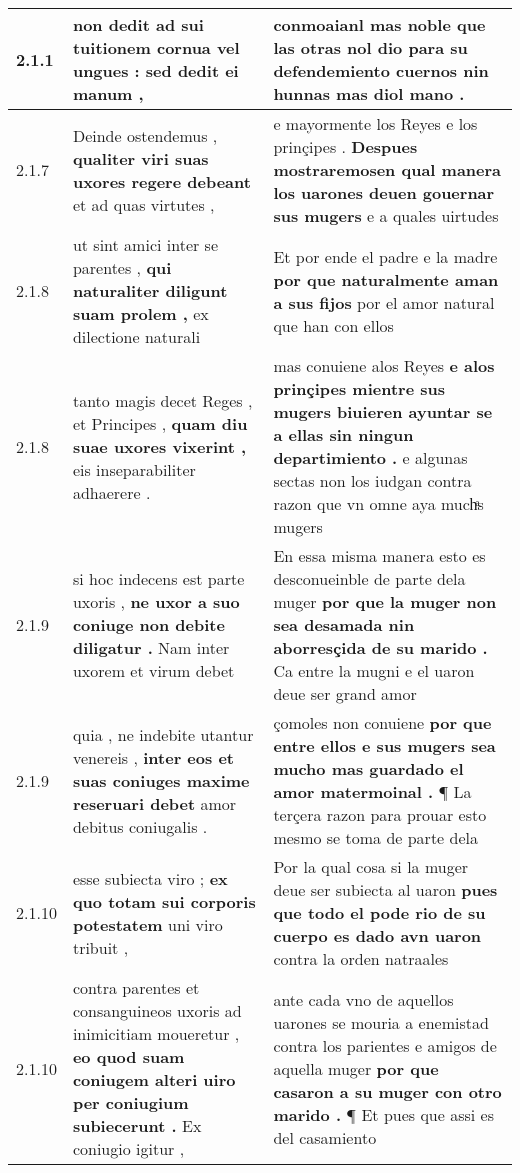 \begin{tabular}{|p{1cm}|p{6.5cm}|p{6.5cm}|}
2.1.1 & non dedit \textbf{ ad sui tuitionem cornua vel ungues : } sed dedit ei manum , & conmoaianl mas noble que las otras nol dio \textbf{ para su defendemiento cuernos } nin hunnas mas diol mano . \\\hline
2.1.7 & Deinde ostendemus , \textbf{ qualiter viri suas uxores regere debeant } et ad quas virtutes , & e mayormente los Reyes e los prinçipes . \textbf{ Despues mostraremosen qual manera los uarones deuen gouernar sus mugers } e a quales uirtudes \\\hline
2.1.8 & ut sint amici inter se parentes , \textbf{ qui naturaliter diligunt suam prolem , } ex dilectione naturali & Et por ende el padre e la madre \textbf{ por que naturalmente aman a sus fijos } por el amor natural que han con ellos \\\hline
2.1.8 & tanto magis decet Reges , et Principes , \textbf{ quam diu suae uxores vixerint , } eis inseparabiliter adhaerere . & mas conuiene alos Reyes \textbf{ e alos prinçipes mientre sus mugers biuieren ayuntar se a ellas sin ningun departimiento . } e algunas sectas non los iudgan contra razon que vn omne aya muchͣs mugers \\\hline
2.1.9 & si hoc indecens est parte uxoris , \textbf{ ne uxor a suo coniuge non debite diligatur . } Nam inter uxorem et virum debet & En essa misma manera esto es desconueinble de parte dela muger \textbf{ por que la muger non sea desamada nin aborresçida de su marido . } Ca entre la mugni e el uaron deue ser grand amor \\\hline
2.1.9 & quia , ne indebite utantur venereis , \textbf{ inter eos et suas coniuges maxime reseruari debet } amor debitus coniugalis . & çomoles non conuiene \textbf{ por que entre ellos e sus mugers sea mucho mas guardado el amor matermoinal . } ¶ La terçera razon para prouar esto mesmo se toma de parte dela \\\hline
2.1.10 & esse subiecta viro ; \textbf{ ex quo totam sui corporis potestatem } uni viro tribuit , & Por la qual cosa si la muger deue ser subiecta al uaron \textbf{ pues que todo el pode rio de su cuerpo es dado avn uaron } contra la orden natraales \\\hline
2.1.10 & contra parentes et consanguineos uxoris ad inimicitiam moueretur , \textbf{ eo quod suam coniugem alteri uiro per coniugium subiecerunt . } Ex coniugio igitur , & ante cada vno de aquellos uarones se mouria a enemistad contra los parientes e amigos de aquella muger \textbf{ por que casaron a su muger con otro marido . } ¶ Et pues que assi es del casamiento \\\hline

\end{tabular}
